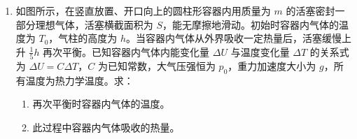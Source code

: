 \documentclass[\gkver]{gaokaozhenti}
\begin{document}
\begin{enumerate}
{	对于B选项，对于有质量的弹簧，设弹簧质量为$m$，所挂振子的质量为$M$。对于这样的系统做振动，其周期我们可以把弹簧的质量约化到振子的质量上去，等效为一个弹簧质量不计，振子质量为$M^{\prime}=M+\alpha m$的系统。其中的约化系数$\alpha$与两者的质量有关，无一般解析式。
	
	对于$M \gg m$的情况，$\alpha=1/3$；对于$M\ll m$的情况，$\alpha={4}/{\pi^2}$。
}

\item
如图所示，在竖直放置、开口向上的圆柱形容器内用质量为 $ m $ 的活塞密封一部分理想气体，活塞横截面积为 $ S $，能无摩擦地滑动。初始时容器内气体的温度为 $ T_{0} $，气柱的高度为 $ h $。当容器内气体从外界吸收一定热量后，活塞缓慢上升 $ \frac{1}{5}h $ 再次平衡。已知容器内气体内能变化量 $ \Delta U $ 与温度变化量 $ \Delta T $ 的关系式为 $ \Delta U = C\Delta T $，$ C $ 为已知常数，大气压强恒为 $ p_{0} $，重力加速度大小为 $ g $，所有温度为热力学温度。求：
\begin{enumerate}
	\item 
	再次平衡时容器内气体的温度。
	
	\item
	此过程中容器内气体吸收的热量。
\end{enumerate}

\end{enumerate}
\end{document}
